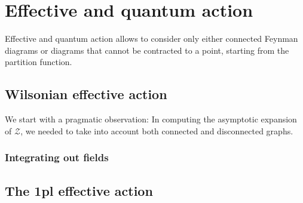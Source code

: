 \documentclass[../main/main.tex]{subfiles}
\begin{document}
\chapter{Effective and quantum action}

Effective and quantum action allows to consider only either connected Feynman diagrams or diagrams that cannot be contracted to a point, starting from the partition function. 

\section{Wilsonian effective action}

We start with a pragmatic observation: In computing the asymptotic expansion of $\mathcal Z$, we needed to take into account both connected and disconnected graphs. 

























\subsection{Integrating out fields}

\section{The 1pl effective action}
\end{document}
